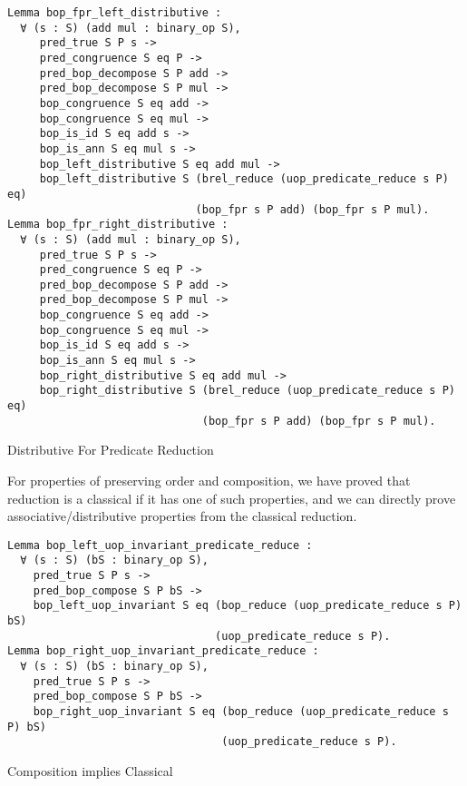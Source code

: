 \begin{listing}[H]
\begin{verbatim}
Lemma bop_fpr_left_distributive :
  ∀ (s : S) (add mul : binary_op S),
     pred_true S P s -> 
     pred_congruence S eq P ->
     pred_bop_decompose S P add ->
     pred_bop_decompose S P mul ->          
     bop_congruence S eq add ->     
     bop_congruence S eq mul -> 
     bop_is_id S eq add s ->     
     bop_is_ann S eq mul s ->
     bop_left_distributive S eq add mul ->
     bop_left_distributive S (brel_reduce (uop_predicate_reduce s P) eq) 
                             (bop_fpr s P add) (bop_fpr s P mul).
Lemma bop_fpr_right_distributive :
  ∀ (s : S) (add mul : binary_op S),
     pred_true S P s -> 
     pred_congruence S eq P ->
     pred_bop_decompose S P add ->
     pred_bop_decompose S P mul ->          
     bop_congruence S eq add ->     
     bop_congruence S eq mul -> 
     bop_is_id S eq add s ->     
     bop_is_ann S eq mul s ->
     bop_right_distributive S eq add mul ->
     bop_right_distributive S (brel_reduce (uop_predicate_reduce s P) eq) 
                              (bop_fpr s P add) (bop_fpr s P mul).
\end{verbatim}
\caption{Distributive For Predicate Reduction} 
\label{coq:proof:predicate_distributive}
\end{listing}
For properties of preserving order and composition, we have proved that reduction is a classical if it has one of such properties, and we can directly prove associative/distributive properties from the classical reduction.
\begin{listing}[H]
\begin{verbatim}
Lemma bop_left_uop_invariant_predicate_reduce :
  ∀ (s : S) (bS : binary_op S),
    pred_true S P s -> 
    pred_bop_compose S P bS ->
    bop_left_uop_invariant S eq (bop_reduce (uop_predicate_reduce s P) bS) 
                                (uop_predicate_reduce s P).
Lemma bop_right_uop_invariant_predicate_reduce :
  ∀ (s : S) (bS : binary_op S),
    pred_true S P s -> 
    pred_bop_compose S P bS ->    
    bop_right_uop_invariant S eq (bop_reduce (uop_predicate_reduce s P) bS) 
                                 (uop_predicate_reduce s P).
\end{verbatim}
\caption{Composition implies Classical} 
\label{coq:proof:composition_classic}
\end{listing}

